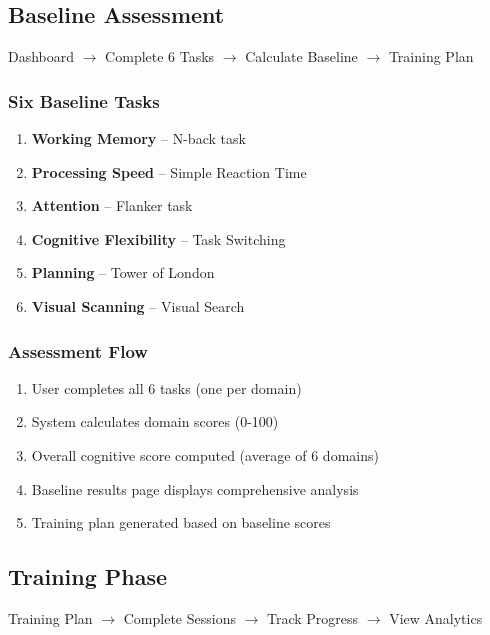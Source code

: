 \documentclass[12pt,a4paper]{article}
\begin{document}
\subsection{Baseline Assessment}

\begin{center}
Dashboard $\rightarrow$ Complete 6 Tasks $\rightarrow$ Calculate Baseline $\rightarrow$ Training Plan
\end{center}

\subsubsection{Six Baseline Tasks}
\begin{enumerate}
    \item \textbf{Working Memory} -- N-back task
    \item \textbf{Processing Speed} -- Simple Reaction Time
    \item \textbf{Attention} -- Flanker task
    \item \textbf{Cognitive Flexibility} -- Task Switching
    \item \textbf{Planning} -- Tower of London
    \item \textbf{Visual Scanning} -- Visual Search
\end{enumerate}

\subsubsection{Assessment Flow}
\begin{enumerate}
    \item User completes all 6 tasks (one per domain)
    \item System calculates domain scores (0-100)
    \item Overall cognitive score computed (average of 6 domains)
    \item Baseline results page displays comprehensive analysis
    \item Training plan generated based on baseline scores
\end{enumerate}

\subsection{Training Phase}

\begin{center}
Training Plan $\rightarrow$ Complete Sessions $\rightarrow$ Track Progress $\rightarrow$ View Analytics
\end{center}
\end{document}
